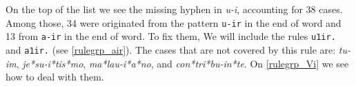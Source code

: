



On the top of the list we see the missing hyphen in \emph{u-i}, accounting for
38 cases. Among those, 34 were originated from the pattern \texttt{u-ir} in the
end of word and 13 from \texttt{a-ir} in the end of word. 
To fix them, We will include the rules \texttt{u1ir.} and \texttt{a1ir.} (see 
\cref{rulegrp_air}). The cases that are not covered by this rule are:
\emph{tu-im}, \emph{je*su-i*tis*mo}, \emph{ma*lau-i*a*no}, and
\emph{con*tri*bu-in*te}. On \cref{rulegrp_Vi} we see how to deal with
them.

